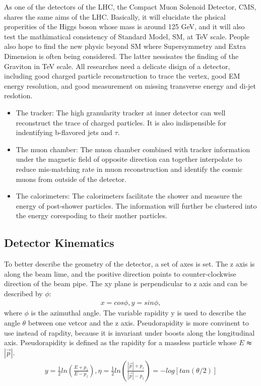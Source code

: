 As one of the detectors of the LHC, the Compact Muon Solenoid Detector, CMS, shares the same aims of the LHC.
Basically, it will elucidate the phsical properities of the Higgs boson whose mass is around 125 GeV, and it will also test the mathimatical consistency of Standard Model, SM, at TeV scale.
People also hope to find the new physic beyond SM where Supersymmetry and Extra Dimension is often being considered. The latter nessisates the finding of the Graviton in TeV scale.
All researches need a delicate disign of a detector, including good charged particle reconstruction to trace the vertex, good EM energy resolution, and good measurement on missing transverse energy and di-jet reslotion.
\begin{itemize}
\item The tracker: The high granularity tracker at inner detector can well reconstruct the trace of charged particles. It is also indispensible for indentifying b-flavored jets and $\tau$.  
\item The muon chamber: The muon chamber combined with tracker information under the magnetic field of opposite direction can together interpolate to reduce mis-matching rate in muon reconstruction and identify the cosmic muons from outside of the detector.
\item The calorimeters: The calorimeters facilitate the shower and measure the energy of post-shower particles. The information will further be clustered into the energy corespoding to their mother particles.
\end{itemize}

\subsection{Detector Kinematics} 
To better describe the geometry of the detector, a set of axes is set. The z axis is along the beam lime, and the positive direction points to counter-clockwise direction of the beam pipe. The xy plane is perpendicular to z axis and can be described by $\phi $:
\begin{equation} \label{eq1}
\begin{split}
x=cos\phi, y=sin\phi,
\end{split}
\end{equation}
where $\phi$ is the azimuthal angle. The variable rapidity y is used to describe the angle $\theta$ between one vetcor and the z axis. Pseudorapidity is more convinent to use  instead of rapdity, because it is invariant under boosts along the longitudinal axis. Pseudorapidity is defined as the rapidity for a massless particle whose $E$ $\thickapprox$ $|\vec{p}|$.
\begin{equation} \label{eq1}
\begin{split}
y = \frac{1}{2} ln( \frac{E+p_z}{E-p_z} ), \eta = \frac{1}{2} ln( \frac{|\vec{p}|+p_z}{|\vec{p}|-p_z} ) = -log[tan(\theta /2)]
\end{split}
\end{equation}

